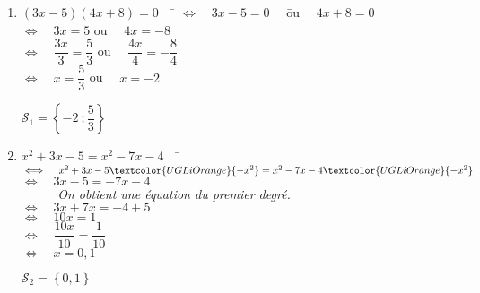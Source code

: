 \documentclass[a4paper,11pt,exos]{nsi} %
\begin{document}
\begin{enumerate}
    \item \begin{tabbing}
        $(3x-5)(4x+8)=0 \quad$ \= $\iff \quad 3x-5=0\quad$ \= ou $\quad 4x+8=0$\\
        \>  $\iff \quad 3x=5$   \> ou $\quad 4x=-8$\\
        \>  $\iff \quad \dfrac{3x}{3}=\dfrac{5}{3}$ \> ou $\quad \dfrac{4x}{4}=-\dfrac{8}{4}$\\%
        \>  $\iff \quad x=\dfrac{5}{3}$ \> ou $\quad x=-2$ 
    \end{tabbing}
    $\mathcal{S}_1=\left\{-2\ ;\dfrac{5}{3}\right\}$

    \item \begin{tabbing}
        $x^2+3x-5=x^2-7x-4\quad$    \= $\iff \quad x^2+3x-5 \textcolor{UGLiOrange}{-x^2}=x^2-7x-4 \textcolor{UGLiOrange}{-x^2}$\\
        \>  $\iff\quad 3x-5=-7x-4\qquad$\\
        \>  $\phantom{\iff}\quad$ \textit{On obtient une équation du premier degré.}\\
        \>  $\iff\quad 3x+7x=-4+5$\\
        \>  $\iff\quad 10x=1$\\
        \>  $\iff\quad \dfrac{10x}{10}=\dfrac{1}{10}$\\
        \>  $\iff\quad x=0,1$
    \end{tabbing}
    $\mathcal{S}_2=\left\{0,1\right\}$


\end{enumerate}
\end{document}
